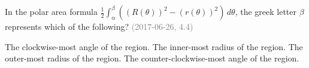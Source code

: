 \documentclass[12pt]{exam}
\newcommand{\questionDate}[1]{\textcolor{gray}{(#1)}}
\newcommand{\<}{\langle}
\renewcommand{\>}{\rangle}
\begin{document}
\begin{questions}
  \question
  In the polar area formula \(\frac{1}{2}\int_\alpha^\beta((R(\theta))^2-(r(\theta))^2)\,d\theta\),
  the greek letter \(\beta\) represents which of the following?
  \questionDate{2017-06-26, 4.4}
  \begin{choices}
    \CorrectChoice
      The clockwise-most angle of the region.
    \choice
      The inner-most radius of the region.
    \choice
      The outer-most radius of the region.
    \choice
      The counter-clockwise-most angle of the region.
  \end{choices}
%
%
%
%
%
%
%

\end{questions}
\end{document}
